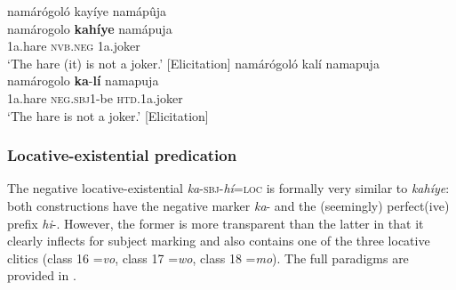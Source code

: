 \documentclass[output=paper,colorlinks=true, citecolor=brown,draftmode]{langscibook}
\begin{document}
\ea\label{ex:cuw:26}
    \ea\label{ex:cuw:26a} namárógoló kayíye namápûja\\ 
        \gll namárogolo \textbf{kahíye} namápuja \\
              1a.hare \textsc{nvb.neg} 1a.joker\textsc{} \\
        \glt ‘The hare (it) is not a joker.’ [Elicitation]
    \ex\label{ex:cuw:26b} namárógoló kalí namapuja \\
        \gll namárogolo \textbf{ka}{}-\textbf{lí} namapuja \\
              1a.hare \textsc{neg.sbj1}{}-be \textsc{htd}.1a.joker\\
        \glt ‘The hare is not a joker.’ [Elicitation]
    \z
\z 

\subsubsection{Locative-existential predication}\label{sec:cuw:2.3.4}\label{sec:cuw:2.3.3}
The negative locative-existential \textit{ka}{}-\textsc{sbj}{}-\textit{hí}=\textsc{loc} is formally very similar to \textit{kahíye}: both constructions have the negative marker \textit{ka}{}- and the (seemingly) perfect(ive) prefix \textit{hi}{}-. However, the former is more transparent than the latter in that it clearly inflects for subject marking and also contains one of the three locative clitics (class 16 =\textit{vo}, class 17 =\textit{wo}, class 18 =\textit{mo}). The full paradigms are provided in . 
\end{document}
